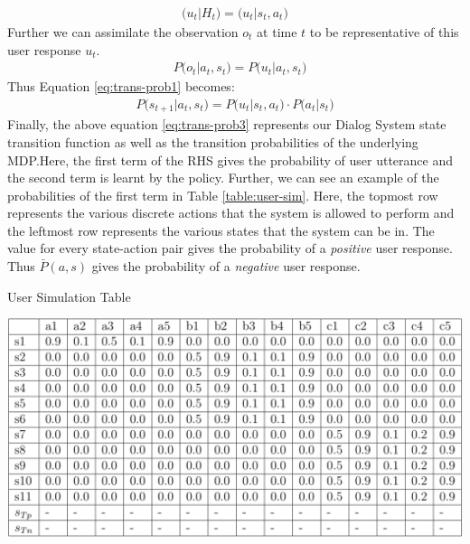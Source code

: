 \documentclass[12pt]{extarticle}
\numberwithin{equation}{section}
\begin{document}
		\begin{align}
	\big(u_t | H_t\big) = \big(u_t | s_t, a_t\big)
	\end{align}
	Further we can assimilate the observation $o_t$ at time $t$ to be representative of this user response $u_t$.
	\begin{align}
	&P\big(o_t | a_t, s_t\big)  =  P\big(u_t | a_t, s_t\big)
	\end{align}
	Thus Equation \ref{eq:trans-prob1} becomes:
	\begin{align}\label{eq:trans-prob3}
	P\big(s_{t+1}|a_t, s_t\big) = P\big(u_t| s_t,a_t\big)\cdot P\big(a_t|s_t\big)
	\end{align}
	Finally, the above equation \ref{eq:trans-prob3} represents our Dialog System state transition function as well as the transition probabilities of the underlying MDP.Here, the first term of the RHS gives the probability of user utterance and the second term is learnt by the policy. Further, we can see an example of the probabilities of the first term in Table \ref{table:user-sim}. Here, the topmost row represents the various discrete actions that the system is allowed to perform and the leftmost row represents the various states that the system can be in. The value for every state-action pair gives the probability of a \textit{positive} user response. Thus $\bar{P}(a,s)$ gives the probability of a \textit{negative} user response.
	\begin{table}[h]
		\caption{User Simulation Table}
		\label{table:user-sim}
		\includegraphics[width=\linewidth]{sim-table}
	\end{table}
	\clearpage
	\par
\end{document}
